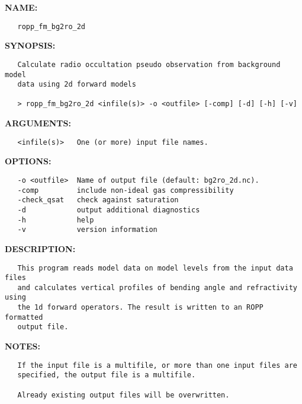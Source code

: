 \label{ch:robo72}
\label{ch:Programs_ropp_fm_bg2ro_2d}
\textbf{NAME:}\hspace{0.08in}\begin{Verbatim}
   ropp_fm_bg2ro_2d
\end{Verbatim}
\textbf{SYNOPSIS:}\hspace{0.08in}\begin{Verbatim}
   Calculate radio occultation pseudo observation from background model
   data using 2d forward models

   > ropp_fm_bg2ro_2d <infile(s)> -o <outfile> [-comp] [-d] [-h] [-v]
\end{Verbatim}
\textbf{ARGUMENTS:}\hspace{0.08in}\begin{Verbatim}
   <infile(s)>   One (or more) input file names.
\end{Verbatim}
\textbf{OPTIONS:}\hspace{0.08in}\begin{Verbatim}
   -o <outfile>  Name of output file (default: bg2ro_2d.nc).
   -comp         include non-ideal gas compressibility
   -check_qsat   check against saturation
   -d            output additional diagnostics
   -h            help
   -v            version information
\end{Verbatim}
\textbf{DESCRIPTION:}\hspace{0.08in}\begin{Verbatim}
   This program reads model data on model levels from the input data files
   and calculates vertical profiles of bending angle and refractivity using
   the 1d forward operators. The result is written to an ROPP formatted
   output file.
\end{Verbatim}
\textbf{NOTES:}\hspace{0.08in}\begin{Verbatim}
   If the input file is a multifile, or more than one input files are
   specified, the output file is a multifile.

   Already existing output files will be overwritten.
\end{Verbatim}
